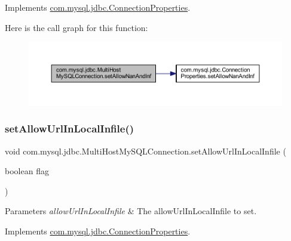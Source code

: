 Implements \mbox{\hyperlink{interfacecom_1_1mysql_1_1jdbc_1_1_connection_properties_aed2f8233f5faee7186e807c4f737b12d}{com.\+mysql.\+jdbc.\+Connection\+Properties}}.

Here is the call graph for this function\+:
\nopagebreak
\begin{figure}[H]
\begin{center}
\leavevmode
\includegraphics[width=350pt]{classcom_1_1mysql_1_1jdbc_1_1_multi_host_my_s_q_l_connection_a301b4bf7a1c4e8bdbf15cc7a977cd0b8_cgraph}
\end{center}
\end{figure}
\mbox{\label{classcom_1_1mysql_1_1jdbc_1_1_multi_host_my_s_q_l_connection_a65ced19d9988a77826c138d8d2f1574e}} 
\subsubsection{\texorpdfstring{set\+Allow\+Url\+In\+Local\+Infile()}{setAllowUrlInLocalInfile()}}
{\footnotesize\ttfamily void com.\+mysql.\+jdbc.\+Multi\+Host\+My\+S\+Q\+L\+Connection.\+set\+Allow\+Url\+In\+Local\+Infile (\begin{DoxyParamCaption}\item[{boolean}]{flag }\end{DoxyParamCaption})}


\begin{DoxyParams}{Parameters}
{\em allow\+Url\+In\+Local\+Infile} & The allow\+Url\+In\+Local\+Infile to set. \\
\hline
\end{DoxyParams}


Implements \mbox{\hyperlink{interfacecom_1_1mysql_1_1jdbc_1_1_connection_properties_ad7e99f72c64f4572e9952747489da7b4}{com.\+mysql.\+jdbc.\+Connection\+Properties}}.

